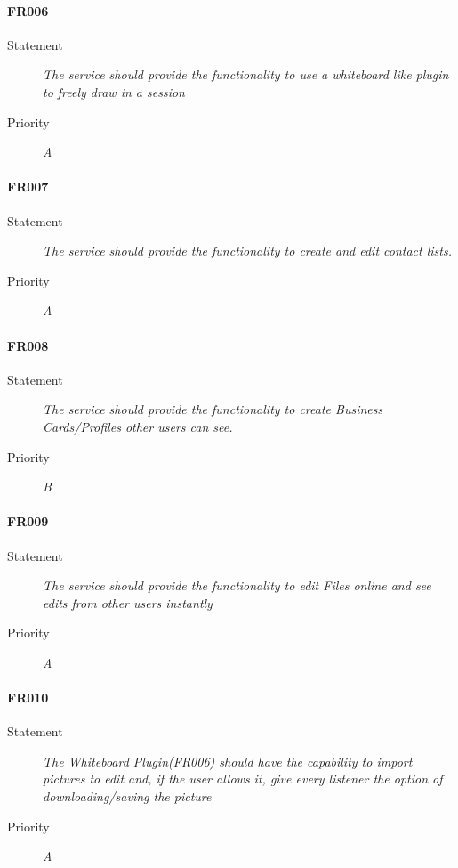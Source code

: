 \paragraph{FR006}
\begin{description}
  \item [Statement] 
    \textit{The service should provide the functionality to use a whiteboard like plugin to freely draw in a session}
  \item [Priority] \textit{A}
\end{description}

\paragraph{FR007}
\begin{description}
  \item [Statement] 
    \textit{The service should provide the functionality to create and edit contact lists.}
  \item [Priority] \textit{A}
\end{description}

\paragraph{FR008}
\begin{description}
  \item [Statement] 
    \textit{The service should provide the functionality to create Business Cards/Profiles other users can see.}
  \item [Priority] \textit{B}
\end{description}

\paragraph{FR009}
\begin{description}
  \item [Statement] 
    \textit{The service should provide the functionality to edit Files online and see edits from other users instantly}
  \item [Priority] \textit{A}
\end{description}

\paragraph{FR010}
\begin{description}
  \item [Statement] 
    \textit{The Whiteboard Plugin(FR006) should have the capability to import pictures to edit and, if the user allows it, give every listener the option of downloading/saving the picture}
  \item [Priority] \textit{A}
\end{description}

